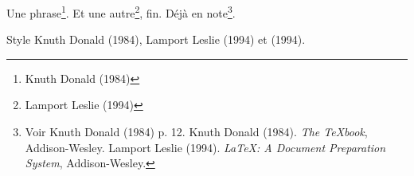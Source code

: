 Une phrase\footnote{Knuth Donald (1984)}. Et une autre\footnote{Lamport Leslie (1994)}, fin.
Déjà en note\footnote{Voir Knuth Donald (1984) p. 12.
\noindent
Knuth Donald (1984). \emph{The TeXbook}, Addison-Wesley.
\noindent
Lamport Leslie (1994). \emph{LaTeX: A Document Preparation System}, Addison-Wesley.}.

Style Knuth Donald (1984), Lamport Leslie (1994) et (1994).
